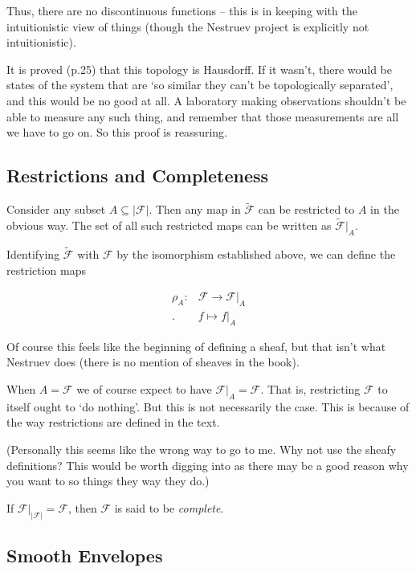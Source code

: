 \documentclass[oneside,english]{amsbook}
\numberwithin{section}{chapter}
\theoremstyle{plain}
\theoremstyle{definition}
\begin{document}
Thus, there are no discontinuous functions -- this is in keeping with the intuitionistic view of things (though the Nestruev project is explicitly not intuitionistic).

It is proved (p.25) that this topology is Hausdorff. If it wasn't, there would be states of the system that are `so similar they can't be topologically separated', and this would be no good at all. A laboratory making observations shouldn't be able to measure any such thing, and remember that those measurements are all we have to go on. So this proof is reassuring.

\subsection{Restrictions and Completeness}

Consider any subset $A\subseteq |\mathscr{F}|$. Then any map in $\tilde{\mathscr{F}}$ can be restricted to $A$ in the obvious way. The set of all such restricted maps can be written as $\tilde{\mathscr{F}}|_A$.

Identifying $\tilde{\mathscr{F}}$ with $\mathscr{F}$ by the isomorphism established above, we can define the restriction maps

	\begin{align*}
		\rho_A: & \mathscr{F}\to\mathscr{F}|_A \\
		. & f\mapsto f|_A
	\end{align*}

Of course this feels like the beginning of defining a sheaf, but that isn't what Nestruev does (there is no mention of sheaves in the book).

When $A = \mathscr{F}$ we of course expect to have $\mathscr{F}|_A = \mathscr{F}$. That is, restricting $\mathscr{F}$ to itself ought to `do nothing'. But this is not necessarily the case. This is because of the way restrictions are defined in the text.

(Personally this seems like the wrong way to go to me. Why not use the sheafy definitions? This would be worth digging into as there may be a good reason why you want to so things they way they do.)

If $\mathscr{F}|_{|\mathscr{F}|} = \mathscr{F}$, then $\mathscr{F}$ is said to be \emph{complete}. 

\subsection{Smooth Envelopes}
\end{document}
